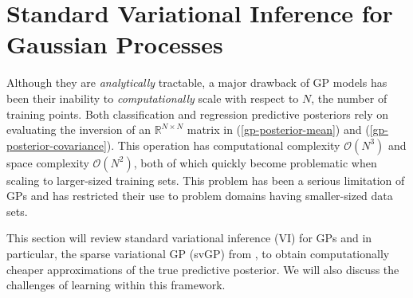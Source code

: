 \documentclass{article}
\numberwithin{equation}{section}
\begin{document}
\section{Standard Variational Inference for Gaussian Processes}\label{section:vi-gp}
Although they are \textit{analytically} tractable, a major drawback of GP models has been their inability to \textit{computationally} scale with respect to $N$, the number of training points.
Both classification and regression predictive posteriors rely on evaluating the inversion of an $\mathbb{R}^{N \times N}$ matrix in (\ref{gp-posterior-mean}) and (\ref{gp-posterior-covariance}).
This operation has computational complexity $\mathcal{O}(N^3)$ and space complexity $\mathcal{O}(N^2)$, both of which quickly become problematic when scaling to larger-sized training sets.
This problem has been a serious limitation of GPs and has restricted their use to problem domains having smaller-sized data sets.

This section will review standard variational inference (VI) for GPs and in particular, the sparse variational GP (svGP) from \cite{titsias2009variational}, to obtain computationally cheaper approximations of the true predictive posterior.
We will also discuss the challenges of learning within this framework.
\end{document}

